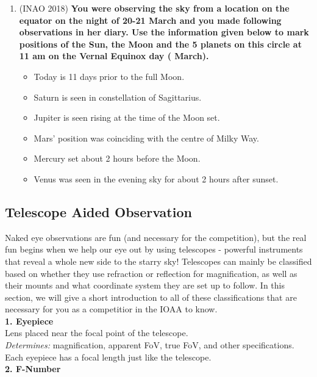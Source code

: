 \documentclass[a4paper,12pt]{extarticle}
\begin{document}
\begin{enumerate}
	
	\item (INAO 2018) \textbf{You were observing the sky from a location on the equator on the night of 20-21 March and you made following observations in her diary. Use the information given below to mark positions of the Sun, the Moon and the 5 planets on this circle at 11 am on the Vernal Equinox day ( March).} \label{INAO18}
	\begin{itemize}
		\item Today is 11 days prior to the full Moon.
		\item Saturn is seen in constellation of Sagittarius.
		\item Jupiter is seen rising at the time of the Moon set.
		\item Mars’ position was coinciding with the centre of Milky Way.
		\item Mercury set about 2 hours before the Moon.
		\item Venus was seen in the evening sky for about 2 hours after sunset.
	\end{itemize}
\end{enumerate}

\clearpage
\subsection{Telescope Aided Observation}
Naked eye observations are fun (and necessary for the competition), but the real fun begins when we help our eye out by using telescopes - powerful instruments that reveal a whole new side to the starry sky! Telescopes can mainly be classified based on whether they use refraction or reflection for magnification, as well as their mounts and what coordinate system they are set up to follow. In this section, we will give a short introduction to all of these classifications that are necessary for you as a competitior in the IOAA to know.\\

\textbf{1. Eyepiece}\\ 

Lens placed near the focal point of the telescope.\\
\textit{Determines:} magnification, apparent FoV, true FoV, and other specifications. Each eyepiece has a focal length just like the telescope.\\


\textbf{2. F-Number}\\ 
\end{document}
